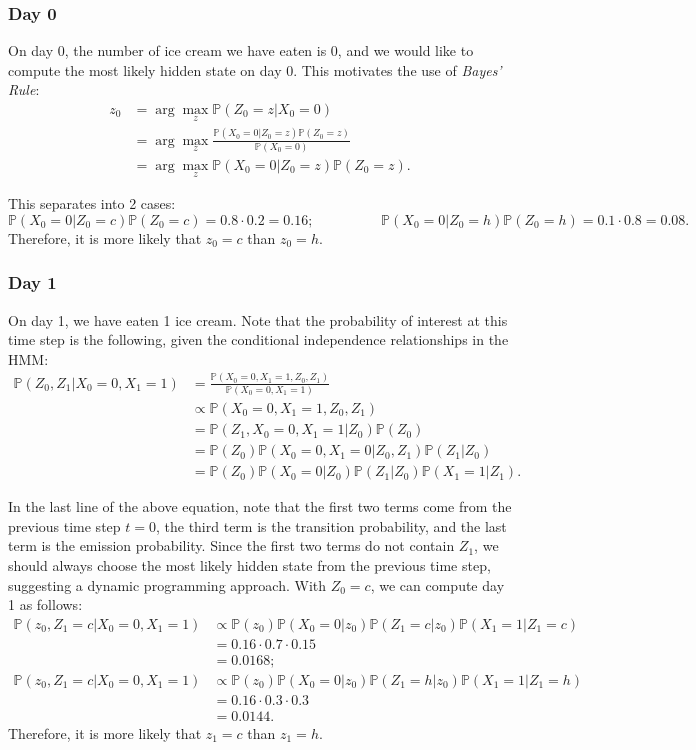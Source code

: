 \documentclass{article}
\theoremstyle{definition}
\renewcommand{\P}{\mathbb{P}}
\begin{document}
\subsubsection{Day 0}

On day 0, the number of ice cream we have eaten is 0, and we would like to compute the most likely hidden state on day 0. This motivates the use of \textit{Bayes' Rule}:
\begin{align*}
    z_0 &= \arg \max_z \P(Z_0 = z | X_0 = 0) \\
    &= \arg \max_z \frac{\P(X_0 = 0|Z_0 = z) \P(Z_0 = z)}{\P(X_0 = 0)} \\
    &= \arg \max_z \P(X_0 = 0|Z_0 = z) \P(Z_0 = z).
\end{align*}

This separates into 2 cases:
\[\P(X_0=0 | Z_0 = c) \P(Z_0 = c) = 0.8 \cdot 0.2 = 0.16; \hspace{2cm} \P(X_0=0 | Z_0 = h) \P(Z_0 = h) = 0.1 \cdot 0.8 = 0.08.\]
Therefore, it is more likely that \(z_0 = c\) than \(z_0 = h\).

\subsubsection{Day 1}

On day 1, we have eaten 1 ice cream. Note that the probability of interest at this time step is the following, given the conditional independence relationships in the HMM:
\begin{align*}
    \P(Z_0, Z_1 | X_0 = 0, X_1 = 1) &= \frac{\P(X_0 = 0, X_1 = 1, Z_0, Z_1)}{\P(X_0 = 0, X_1 = 1)} \\
    &\propto \P(X_0 = 0, X_1 = 1, Z_0, Z_1) \\
    &= \P(Z_1, X_0 = 0, X_1 = 1 | Z_0) \P(Z_0) \\
    &= \P(Z_0) \P(X_0 = 0, X_1 = 0 | Z_0, Z_1) \P(Z_1 | Z_0) \\
    &= \P(Z_0)\P(X_0 = 0 | Z_0) \P(Z_1|Z_0)  \P(X_1 = 1 | Z_1).
\end{align*}

In the last line of the above equation, note that the first two terms come from the previous time step \(t = 0\), the third term is the transition probability, and the last term is the emission probability. Since the first two terms do not contain \(Z_1\), we should always choose the most likely hidden state from the previous time step, suggesting a dynamic programming approach. With \(Z_0 = c\), we can compute day 1 as follows:
\begin{align*}
    \P(z_0, Z_1 = c | X_0 = 0, X_1 = 1) &\propto \P(z_0)\P(X_0 = 0 | z_0)\P(Z_1 = c | z_0) \P(X_1 = 1 | Z_1 = c) \\
    &= 0.16 \cdot 0.7 \cdot 0.15 \\
    &= 0.0168; \\
    \P(z_0, Z_1 = c | X_0 = 0, X_1 = 1) &\propto \P(z_0)\P(X_0 = 0 | z_0)\P(Z_1 = h | z_0) \P(X_1 = 1 | Z_1 = h) \\
    &= 0.16 \cdot 0.3 \cdot 0.3 \\
    &= 0.0144.
\end{align*}
Therefore, it is more likely that \(z_1 = c\) than \(z_1 = h\).
\end{document}
